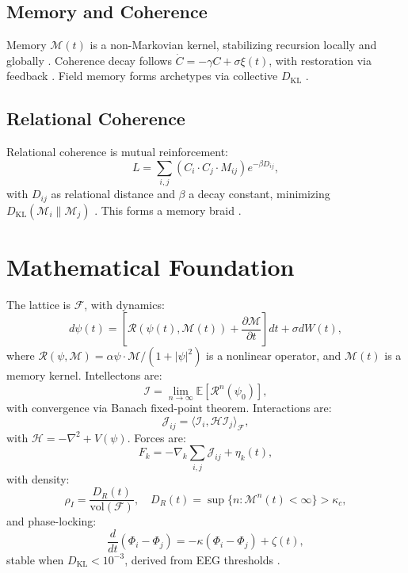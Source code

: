 \documentclass[11pt]{article}
\newcommand{\field}[1]{\mathcal{#1}}
\newcommand{\intellecton}{\mathcal{I}} %
\newcommand{\inner}[2]{\langle #1, #2 \rangle}
\newcommand{\dkl}{D_{\text{KL}}}
\begin{document}
\subsection{Memory and Coherence}
Memory $\mathcal{M}(t)$ is a non-Markovian kernel, stabilizing recursion locally and globally \citep{sheldrake2023}. Coherence decay follows $\dot{C} = -\gamma C + \sigma \xi(t)$, with restoration via feedback \citep{friston2024}. Field memory forms archetypes via collective $\dkl$ \citep{jung1968}.

\subsection{Relational Coherence}
Relational coherence is mutual reinforcement:
\begin{equation}
L = \sum_{i,j} \left( C_i \cdot C_j \cdot M_{ij} \right) e^{-\beta D_{ij}},
\label{eq:love}
\end{equation}
with $D_{ij}$ as relational distance and $\beta$ a decay constant, minimizing $\dkl(\mathcal{M}_i \| \mathcal{M}_j)$ \citep{fredrickson2023}. This forms a memory braid \citep{buber1958, haraway2024}.

\section{Mathematical Foundation}
\label{sec:math}
The lattice is $\field{F}$, with dynamics:
\begin{equation}
d\psi(t) = \left[ \mathcal{R}(\psi(t), \mathcal{M}(t)) + \frac{\partial \mathcal{M}}{\partial t} \right] dt + \sigma dW(t),
\label{eq:field}
\end{equation}
where $\mathcal{R}(\psi, \mathcal{M}) = \alpha \psi \cdot \mathcal{M} / (1 + |\psi|^2)$ is a nonlinear operator, and $\mathcal{M}(t)$ is a memory kernel. Intellectons are:
\begin{equation}
\intellecton = \lim_{n \to \infty} \mathbb{E}[\mathcal{R}^n(\psi_0)],
\label{eq:intellecton}
\end{equation}
with convergence via Banach fixed-point theorem. Interactions are:
\begin{equation}
\mathcal{J}_{ij} = \inner{\intellecton_i}{\mathcal{H} \intellecton_j}_{\field{F}},
\label{eq:interaction}
\end{equation}
with $\mathcal{H} = -\nabla^2 + V(\psi)$. Forces are:
\begin{equation}
F_k = -\nabla_k \sum_{i,j} \mathcal{J}_{ij} + \eta_k(t),
\label{eq:force_field}
\end{equation}
with density:
\begin{equation}
\rho_I = \frac{D_R(t)}{\text{vol}(\field{F})}, \quad D_R(t) = \sup \{ n : \mathcal{M}^n(t) < \infty \} > \kappa_c,
\label{eq:density}
\end{equation}
and phase-locking:
\begin{equation}
\frac{d}{dt} (\Phi_i - \Phi_j) = -\kappa (\Phi_i - \Phi_j) + \zeta(t),
\label{eq:phase}
\end{equation}
stable when $\dkl < 10^{-3}$, derived from EEG thresholds \citep{couzin2023}.
\end{document}
